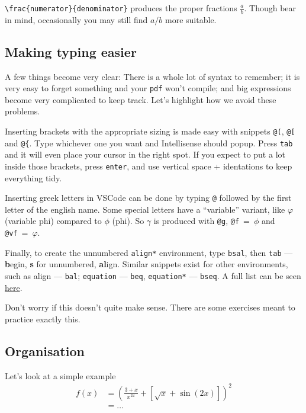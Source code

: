 \verb|\frac{numerator}{denominator}| produces the proper fractions \( \frac{a}{b} \). Though bear in mind, occasionally you may still find \( a/b \) more suitable.

\subsection{Making typing easier}
A few things become very clear: There is a whole lot of syntax to remember; it is very easy to forget something and your \texttt{pdf} won't compile; and big expressions become very complicated to keep track.
Let's highlight how we avoid these problems.

Inserting brackets with the appropriate sizing is made easy with snippets \verb|@(|, \verb|@[| and \verb|@{|.
Type whichever one you want and Intellisense should popup.
Press \verb|tab| and it will even place your cursor in the right spot.
If you expect to put a lot inside those brackets, press \texttt{enter}, and use vertical space + identations to keep everything tidy.

Inserting greek letters in VSCode can be done by typing \verb|@| followed by the first letter of the english name.
Some special letters have a ``variable'' variant, like \(\varphi\) (variable phi) compared to \(\phi\) (phi).
So \(\gamma\) is produced with \verb|@g|, \verb|@f|~=~\(\phi\) and \verb|@vf|~=~\(\varphi\).

Finally, to create the unnumbered \texttt{align*} environment, type \texttt{bsal}, then \texttt{tab} --- \textbf{b}egin, \textbf{s} for unnumbered, \textbf{al}ign.
Similar snippets exist for other environments, such as align --- \texttt{bal}; \texttt{equation} --- \texttt{beq}, \texttt{equation*} --- \texttt{bseq}.
A full list can be seen \href{https://github.com/James-Yu/LaTeX-Workshop/wiki/Snippets}{here}.

Don't worry if this doesn't quite make sense. There are some exercises meant to practice exactly this.

\subsection{Organisation}
Let's look at a simple example 
\begin{align*}
    f(x) & = {
        \left( 
            \frac{3+x}{x^{2x}}
            + \left[ \sqrt{x} + \sin(2x) \right]
        \right)
    }^2
    \\
    &= \dots
\end{align*}


